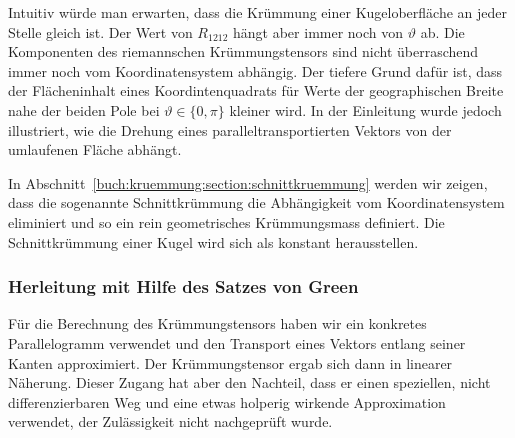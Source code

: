 Intuitiv würde man erwarten, dass die Krümmung einer Kugeloberfläche
an jeder Stelle gleich ist.
Der Wert von $R_{1212}$ hängt aber immer noch von $\vartheta$ ab.
Die Komponenten des riemannschen Krümmungstensors sind nicht überraschend
immer noch vom Koordinatensystem abhängig.
Der tiefere Grund dafür ist, dass der Flächeninhalt eines Koordintenquadrats
für Werte der geographischen Breite nahe der beiden Pole bei
$\vartheta \in \{0,\pi\}$ kleiner wird.
In der Einleitung wurde jedoch illustriert, wie die Drehung eines
paralleltransportierten Vektors von der umlaufenen Fläche abhängt.

In Abschnitt~\ref{buch:kruemmung:section:schnittkruemmung}
werden wir zeigen, dass die sogenannte Schnittkrümmung die
Abhängigkeit vom Koordinatensystem eliminiert und so ein
rein geometrisches Krümmungsmass definiert.
Die Schnittkrümmung einer Kugel wird sich als konstant herausstellen.

%
%
\subsubsection{Herleitung mit Hilfe des Satzes von Green}
Für die Berechnung des Krümmungstensors haben wir ein konkretes
Parallelogramm verwendet und den Transport eines Vektors entlang
seiner Kanten approximiert.
Der Krümmungstensor ergab sich dann in linearer Näherung.
Dieser Zugang hat aber den Nachteil, dass er einen speziellen, nicht
differenzierbaren Weg und eine etwas holperig wirkende Approximation
verwendet, der Zulässigkeit nicht nachgeprüft wurde.

